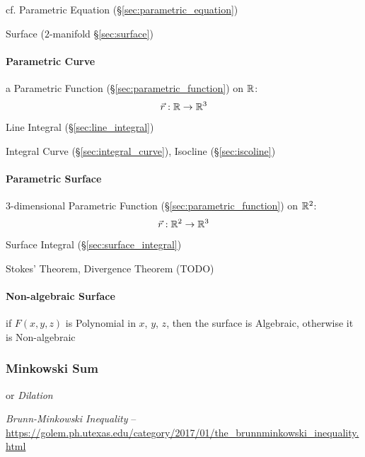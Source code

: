 \fist cf. Parametric Equation (\S\ref{sec:parametric_equation})

\fist Surface ($2$-manifold \S\ref{sec:surface})



\paragraph{Parametric Curve}\label{sec:parametric_curve}\hfill

a Parametric Function (\S\ref{sec:parametric_function}) on $\mathbb{R}$:
\[
  \vec{r} : \mathbb{R} \rightarrow \mathbb{R}^3
\]

Line Integral (\S\ref{sec:line_integral})

Integral Curve (\S\ref{sec:integral_curve}), Isocline (\S\ref{sec:iscoline})



\paragraph{Parametric Surface}\label{sec:parametric_surface}\hfill

3-dimensional Parametric Function (\S\ref{sec:parametric_function}) on
$\mathbb{R}^2$:
\[
  \vec{r} : \mathbb{R}^2 \rightarrow \mathbb{R}^3
\]

Surface Integral (\S\ref{sec:surface_integral})

Stokes' Theorem, Divergence Theorem (TODO)



\paragraph{Non-algebraic Surface}\label{sec:nonalgebraic_surface}\hfill

if $F(x,y,z)$ is Polynomial in $x$, $y$, $z$, then the surface is
Algebraic, otherwise it is Non-algebraic



\subsubsection{Minkowski Sum}\label{sec:minkowski_sum}

or \emph{Dilation}

\emph{Brunn-Minkowski Inequality} --
\url{https://golem.ph.utexas.edu/category/2017/01/the_brunnminkowski_inequality.html}



